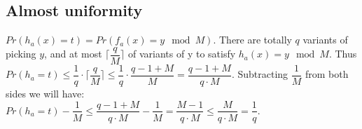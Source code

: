 \subsection*{Almost uniformity}
$Pr(h_a(x) = t) = Pr(f_a(x) = y \mod M)$. 
There are totally $q$ variants of picking $y$, and at most $\lceil{\dfrac{q}{M}}\rceil$ 
of variants of y to satisfy $h_a(x) = y \mod M$. 
Thus $	Pr(h_a = t) \leq \dfrac{1}{q}\cdot \lceil{\dfrac{q}{M}}\rceil \leq 
		\dfrac{1}{q}\cdot \dfrac{q - 1 + M}{M} = \dfrac{q - 1 + M}{q\cdot M}$.
Subtracting $\dfrac{1}{M}$ from both sides we will have:\\
 $	Pr(h_a = t) - \dfrac{1}{M} \leq \dfrac{q - 1 + M}{q\cdot M} - \dfrac{1}{M} = \dfrac{M - 1}{q\cdot M}\leq \dfrac{M}{q\cdot M} = \dfrac{1}{q}$.
